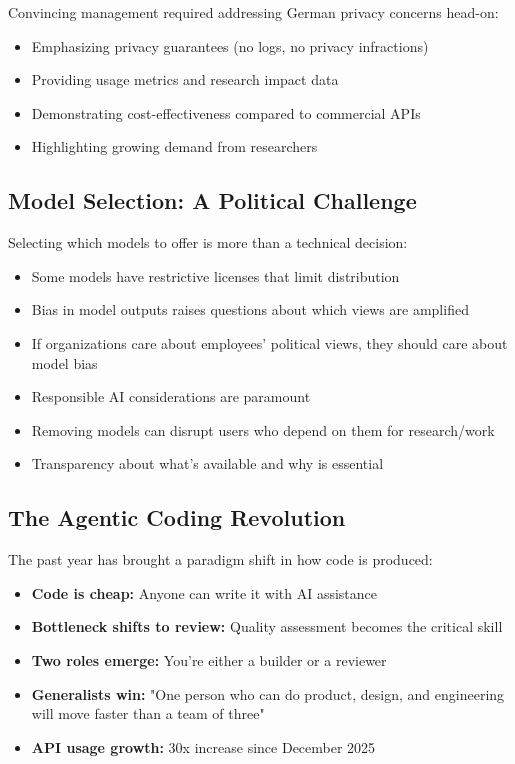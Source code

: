 \documentclass[10pt,conference]{IEEEtran}
\begin{document}
Convincing management required addressing German privacy concerns head-on:
\begin{itemize}
    \item Emphasizing privacy guarantees (no logs, no privacy infractions)
    \item Providing usage metrics and research impact data
    \item Demonstrating cost-effectiveness compared to commercial APIs
    \item Highlighting growing demand from researchers
\end{itemize}

\subsection{Model Selection: A Political Challenge}
Selecting which models to offer is more than a technical decision:
\begin{itemize}
    \item Some models have restrictive licenses that limit distribution
    \item Bias in model outputs raises questions about which views are amplified
    \item If organizations care about employees' political views, they should care about model bias
    \item Responsible AI considerations are paramount
    \item Removing models can disrupt users who depend on them for research/work
    \item Transparency about what's available and why is essential
\end{itemize}

\subsection{The Agentic Coding Revolution}
The past year has brought a paradigm shift in how code is produced:
\begin{itemize}
    \item \textbf{Code is cheap:} Anyone can write it with AI assistance
    \item \textbf{Bottleneck shifts to review:} Quality assessment becomes the critical skill
    \item \textbf{Two roles emerge:} You're either a builder or a reviewer
    \item \textbf{Generalists win:} "One person who can do product, design, and engineering will move faster than a team of three"
    \item \textbf{API usage growth:} 30x increase since December 2025
\end{itemize}
\end{document}
